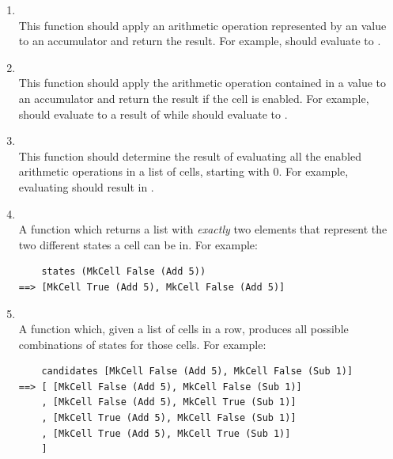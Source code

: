 \begin{enumerate}
	\item {}\\
	This function should apply an arithmetic operation represented by an  value to an accumulator and return the result. For example,  should evaluate to .
	
	\item {}\\
	This function should apply the arithmetic operation contained in a  value to an accumulator and return the result if the cell is enabled. For example,  should evaluate to a result of  while \linebreak {} should evaluate to .
	
	\item {}\\
	This function should determine the result of evaluating all the enabled arithmetic operations in a list of cells, starting with $0$. For example, evaluating  should result in .

	\item {}\\
	A function which returns a list with \emph{exactly} two elements that represent the two different states a cell can be in. For example:
	\begin{verbatim}
    states (MkCell False (Add 5))
==> [MkCell True (Add 5), MkCell False (Add 5)]
	\end{verbatim}

	\item {}\\
	A function which, given a list of cells in a row, produces all possible combinations of states for those cells. For example:
\begin{verbatim}
    candidates [MkCell False (Add 5), MkCell False (Sub 1)]
==> [ [MkCell False (Add 5), MkCell False (Sub 1)]
    , [MkCell False (Add 5), MkCell True (Sub 1)]
    , [MkCell True (Add 5), MkCell False (Sub 1)]
    , [MkCell True (Add 5), MkCell True (Sub 1)]
    ]
\end{verbatim}


\end{enumerate}
